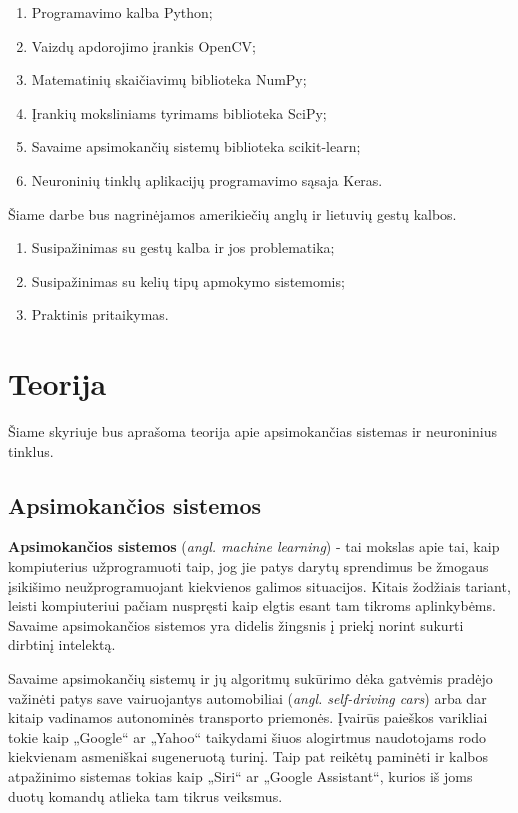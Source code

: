 \documentclass{VUMIFInfKursinis}
\begin{document}
\begin{enumerate}
	\item Programavimo kalba Python;
	\item Vaizdų apdorojimo įrankis OpenCV;
	\item Matematinių skaičiavimų biblioteka NumPy;
	\item Įrankių moksliniams tyrimams biblioteka SciPy;
	\item Savaime apsimokančių sistemų biblioteka scikit-learn;
	\item Neuroninių tinklų aplikacijų programavimo sąsaja Keras.
\end{enumerate}

Šiame darbe bus nagrinėjamos amerikiečių anglų ir lietuvių gestų kalbos.
\begin{enumerate}
	\item Susipažinimas su gestų kalba ir jos problematika;
	\item Susipažinimas su kelių tipų apmokymo sistemomis;
	\item Praktinis pritaikymas.
\end{enumerate}



\section{Teorija}
Šiame skyriuje bus aprašoma teorija apie apsimokančias sistemas ir neuroninius tinklus.

\subsection{Apsimokančios sistemos}
\textbf{Apsimokančios sistemos} (\textit{angl. machine learning}) - tai mokslas apie tai, kaip kompiuterius užprogramuoti taip, jog jie patys darytų sprendimus be žmogaus įsikišimo neužprogramuojant kiekvienos galimos situacijos. Kitais žodžiais tariant, leisti kompiuteriui pačiam nuspręsti kaip elgtis esant tam tikroms aplinkybėms. Savaime apsimokančios sistemos yra didelis žingsnis į priekį norint sukurti dirbtinį intelektą.

Savaime apsimokančių sistemų ir jų algoritmų sukūrimo dėka gatvėmis pradėjo važinėti patys save vairuojantys automobiliai (\textit{angl. self-driving cars}) arba dar kitaip vadinamos autonominės transporto priemonės. Įvairūs paieškos varikliai tokie kaip „Google“ ar „Yahoo“ taikydami šiuos alogirtmus naudotojams rodo kiekvienam asmeniškai sugeneruotą turinį. Taip pat reikėtų paminėti ir kalbos atpažinimo sistemas tokias kaip „Siri“ ar „Google Assistant“, kurios iš joms duotų komandų atlieka tam tikrus veiksmus.
\end{document}
